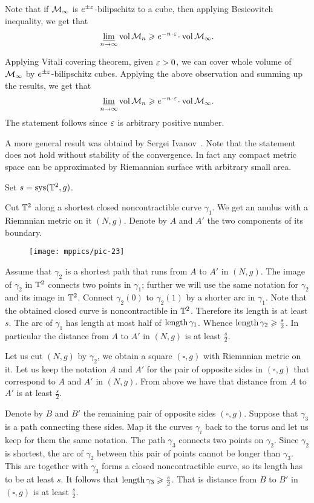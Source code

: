 Note that if $\mathcal{M}_\infty$ is $e^{\pm\varepsilon}$-bilipschitz to a cube, then applying Besicovitch inequality, we get that 
\[\liminf_{n\to\infty} \vol \spc{M}_n\ge e^{-n\cdot \eps}\cdot\vol \spc{M}_\infty.\]

Applying Vitali covering theorem, given $\varepsilon>0$, we can cover whole volume of $\mathcal{M}_\infty$ by $e^{\pm\varepsilon}$-bilipschitz cubes.
Applying the above observation and summing up the results, we get that 
\[\liminf_{n\to\infty} \vol \spc{M}_n\ge e^{-n\cdot \eps}\cdot\vol \spc{M}_\infty.\]
The statement follows since $\varepsilon$ is arbitrary positive number.

 A more general result was obtaind by Sergei Ivanov~\cite{ivanov-1997}.
Note that the statement does not hold without stability of the convergence. In fact any compact metric space can be approximated by Riemannian surface with arbitrary small area.

Set $s=\mathop{\rm sys}\nolimits(\mathbb{T}^2,g)$.

Cut $\mathbb{T}^2$ along a shortest closed noncontractible curve $\gamma_1$.
We get an anulus with a Riemnnian metric on it $(N,g)$.
Denote by $A$ and $A'$ the two components of its boundary.

\begin{wrapfigure}{o}{45 mm}
\vskip2mm
\centering
\texttt{[image: mppics/pic-23]}
\end{wrapfigure}

Assume that $\gamma_2$ is a shortest path that runs from $A$ to $A'$ in $(N,g)$.
The image of $\gamma_2$ in $\mathbb{T}^2$ connects two points in $\gamma_1$;
further we will use the same notation for $\gamma_2$ and its image in $\mathbb{T}^2$.
Connect $\gamma_2(0)$ to $\gamma_2(1)$ by a shorter arc in $\gamma_1$.
Note that the obtained closed curve is noncontractible in $\mathbb{T}^2$.
Therefore its length is at least $s$.
The arc of $\gamma_1$ has length at most half of $\mathop{\rm length}\nolimits\gamma_1$.
Whence $\mathop{\rm length}\nolimits \gamma_2\geqslant \tfrac s2$.
In particular the distance from $A$ to $A'$ in $(N,g)$ is at least $\tfrac s2$.

Let us cut $(N,g)$ by $\gamma_2$, we obtain a square $(\square,g)$ with Riemnnian metric on it.
Let us keep the notation $A$ and $A'$ for the pair of opposite sides in $(\square,g)$ that correspond to $A$ and $A'$ in $(N,g)$.
From above we have that distance from $A$ to $A'$ is at least $\tfrac s2$.

Denote by $B$ and $B'$ the remaining pair of opposite sides $(\square,g)$.
Suppose that $\gamma_3$ is a path connecting these sides.
Map it the curves $\gamma_i$ back to the torus and let us keep for them the same notation.
The path $\gamma_3$ connects two points on $\gamma_2$.
Since $\gamma_2$ is shortest, the arc of $\gamma_2$ between this pair of points cannot be longer than $\gamma_3$.
This arc together with $\gamma_3$ forms a closed noncontractible curve, so its length has to be at least $s$.
It follows that $\mathop{\rm length}\nolimits\gamma_3\geqslant \tfrac s2$.
That is distance from $B$ to $B'$ in  $(\square,g)$ is at least $\tfrac s2$.

